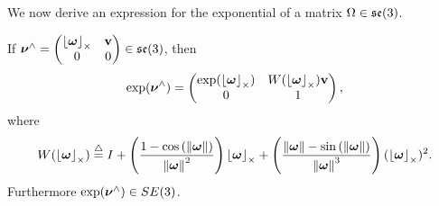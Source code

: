 We now derive an expression for the exponential of a matrix $\Omega\in\se(3)$.
\begin{lemma}
If $\nubf^\wedge = \begin{pmatrix} \ss{\omegabf} & \vbf \\ 0 & 0 \end{pmatrix} \in \se(3)$, then
\[
\exp(\nubf^\wedge) = \begin{pmatrix} \exp(\ss{\omegabf}) & W(\ss{\omegabf})\vbf \\ 0 & 1 \end{pmatrix},
\]
where
\[
W(\ss{\omegabf}) \defeq I+\left(\frac{1-\cos\left(\norm{\omegabf}\right)}{\norm{\omegabf}^{2}}\right)\ss{\omegabf}+\left(\frac{\norm{\omegabf}-\sin\left(\norm{\omegabf}\right)}{\norm{\omegabf}^{3}}\right)(\ss{\omegabf})^{2}.
\]
Furthermore $\exp(\nubf^\wedge) \in SE(3)$.
\end{lemma}
